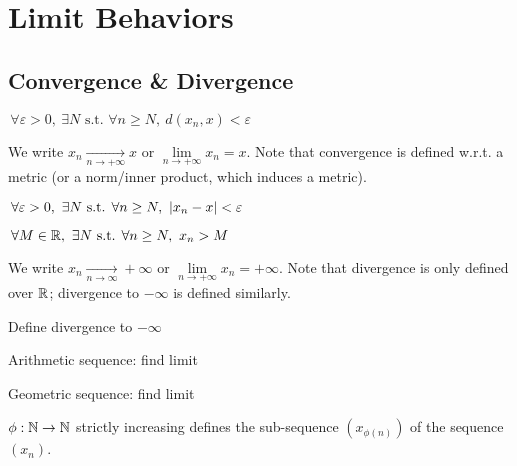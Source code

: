 \chapter{Limit Behaviors}


\section{Convergence \& Divergence}

\begin{definition}
	$\,\forall \varepsilon > 0, \ \exists N \text{ s.t. } \forall n \geq N, \ d(x_n,x) < \varepsilon$
\end{definition}
We write $x_n \xrightarrow[n \to +\infty]{} x \text{ or } \lim\limits_{n \to +\infty} x_n = x$.
Note that convergence is defined w.r.t. a metric (or a norm/inner product, which induces a metric).

\begin{definition}
	$\,\forall \varepsilon > 0, \ \exists N \text{ s.t. } \forall n \geq N, \ | x_n-x | < \varepsilon$
\end{definition}
\begin{definition}
	$\,\forall M \in \mathbb{R}, \ \exists N \text{ s.t. } \forall n \geq N, \ x_n > M$
\end{definition}
We write $x_n \xrightarrow[n \to \infty]{} +\infty \text{ or } \lim\limits_{n \to +\infty} x_n = +\infty$.
Note that divergence is only defined over $\mathbb{R}$; divergence to $-\infty$ is defined similarly.

\begin{question}
	\item Define divergence to $-\infty$
	\item Arithmetic sequence: find limit
	\item Geometric sequence: find limit
\end{question}

\begin{definition}
	$\phi: \mathbb{N} \to \mathbb{N}$ strictly increasing defines the sub-sequence $(x_{\phi(n)})$ of the sequence $(x_n)$.
\end{definition}

